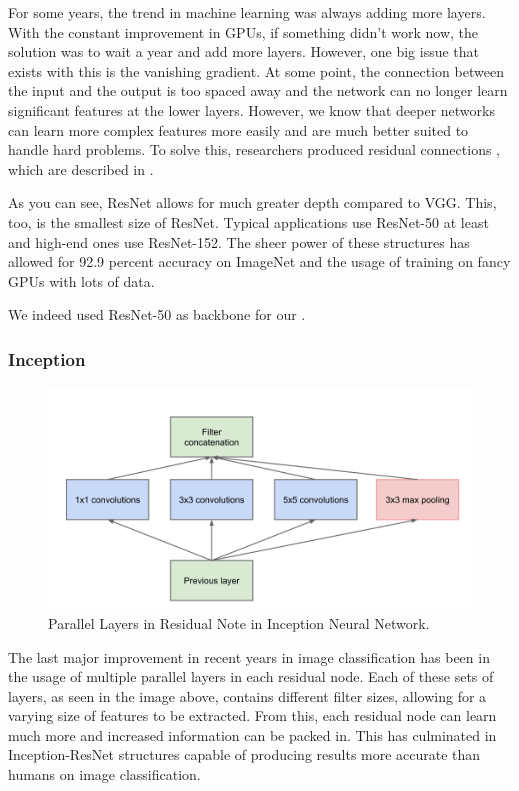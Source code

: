 For some years, the trend in machine learning was always adding more layers. With the constant improvement in GPUs, if something didn't work now, the solution was to wait a year and add more layers. However, one big issue that exists with this is the vanishing gradient. At some point, the connection between the input and the output is too spaced away and the network can no longer learn significant features at the lower layers. However, we know that deeper networks can learn more complex features more easily and are much better suited to handle hard problems. To solve this, researchers produced residual connections \cite{he2016deep}, which are described in .

As you can see, ResNet allows for much greater depth compared to VGG. This, too, is the smallest size of ResNet. Typical applications use ResNet-50 at least and high-end ones use ResNet-152. The sheer power of these structures has allowed for 92.9 percent accuracy on ImageNet and the usage of training on fancy GPUs with lots of data.

We indeed used ResNet-50 as backbone for our \maskrcnn.


\subsubsection{Inception}\label{s:imagenet-inception}
\begin{figure}[H]
	\centering
	\includegraphics[scale=0.5]{images/inception}
	\caption{Parallel Layers in Residual Note in Inception Neural Network.}
	\label{f:imagenet-inception}
\end{figure}

The last major improvement in recent years in image classification has been in the usage of multiple parallel layers in each residual node. Each of these sets of layers, as seen in the image above, contains different filter sizes, allowing for a varying size of features to be extracted. From this, each residual node can learn much more and increased information can be packed in. This has culminated in Inception-ResNet structures capable of producing results more accurate than humans on image classification.

